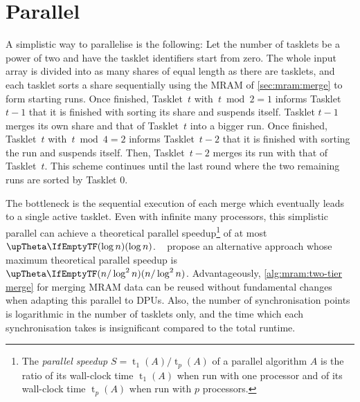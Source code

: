 \section{Parallel \texorpdfstring{\MS{}}{MergeSort}}
\label{sec:mram:par}

A simplistic way to parallelise \MS{} is the following:
Let the number of tasklets be a power of two and have the tasklet identifiers start from zero.
The whole input array is divided into as many shares of equal length as there are tasklets, and each tasklet sorts a share sequentially using the \ac{MRAM} \MS{} of \cref{sec:mram:merge} to form starting runs.
Once finished, Tasklet~\(t\) with~\(t \bmod 2 = 1\) informs Tasklet~\(t - 1\) that it is finished with sorting its share and suspends itself.
Tasklet \(t - 1\) merges its own share and that of Tasklet~\(t\) into a bigger run.
Once finished, Tasklet~\(t\) with~\(t \bmod 4 = 2\) informs Tasklet~\(t - 2\) that it is finished with sorting the run and suspends itself.
Then, Tasklet~\(t - 2\) merges its run with that of Tasklet~\(t\).
This scheme continues until the last round where the two remaining runs are sorted by Tasklet 0.

The bottleneck is the sequential execution of each merge which eventually leads to a single active tasklet.
Even with infinite many processors, this simplistic parallel \MS{} can achieve a theoretical parallel speedup\footnote{
	The \emph{parallel speedup} \(S = \operatorname{t}_1(A) / \operatorname{t}_p(A)\) of a parallel algorithm \(A\) is the ratio of its wall-clock time \(\operatorname{t}_1(A)\) when run with one processor and of its wall-clock time \(\operatorname{t}_p(A)\) when run with \(p\) processors.
} of at most \(\bigtheta{\log n}\).
~\cite{cormen2013algorithmen} propose an alternative approach whose maximum theoretical parallel speedup is \(\bigtheta{n / \log^2 n}\).
Advantageously, \cref{alg:mram:two-tier merge} for merging \ac{MRAM} data can be reused without fundamental changes when adapting this parallel \MS{} to \acp{DPU}.
Also, the number of synchronisation points is logarithmic in the number of tasklets only, and the time which each synchronisation takes is insignificant compared to the total runtime.




